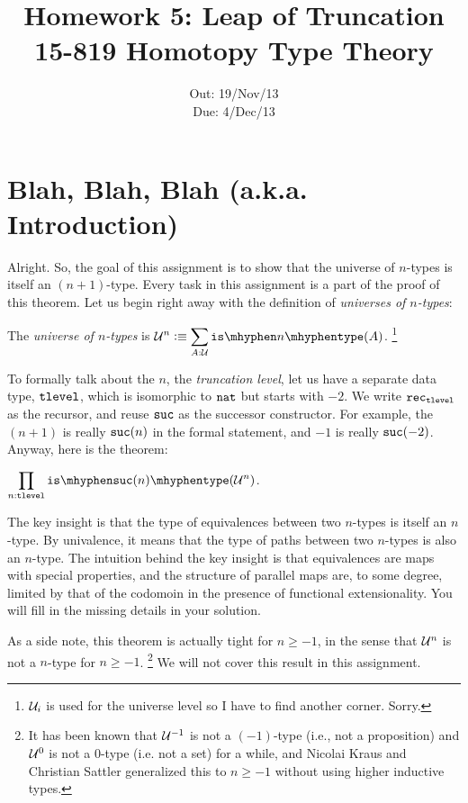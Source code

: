 \documentclass[12pt]{article}
\title{\Large\textbf{
  Homework 5: Leap of Truncation}
\normalsize\\
15-819 Homotopy Type Theory}
\author{}
\date{%
Out: 19/Nov/13\\
Due: 4/Dec/13
}
\theoremstyle{plain}
\begin{document}
\maketitle

\section{Blah, Blah, Blah (a.k.a. Introduction)}

Alright. So, the goal of this assignment is to show that
the universe of $n$-types is itself an $(n{+}1)$-type.
Every task in this assignment is a part of the proof of this theorem.
Let us begin right away with the definition of \emph{universes of $n$-types}:
\begin{definition}
  The
  \emph{universe of $n$-types}
  is
  $\displaystyle \U^n \defeq \sum_{A:\U} \istype{n}(A)$.%
  \footnote{$\mathcal{U}_i$ is used for the universe level so I have to find another corner. Sorry.}
\end{definition}

To formally talk about the $n$, the \emph{truncation level},
let us have a separate data type, $\mathtt{tlevel}$,
which is isomorphic to $\mathtt{nat}$ but starts with $-2$.
We write $\mathtt{rec}_{\mathtt{tlevel}}$ as the recursor,
and reuse $\mathtt{suc}$ as the successor constructor.
For example, the $(n{+}1)$ is really $\mathtt{suc}(n)$ in the formal statement,
and $-1$ is really $\mathtt{suc}(-2)$.
Anyway, here is the theorem:
\begin{theorem}
  $\displaystyle \prod_{n:\tlevel} \istype{\suc(n)}(\U^n)$.
\end{theorem}

The key insight is that
the type of equivalences between two $n$-types
is itself an $n$-type.
By univalence,
it means that the type of paths between two $n$-types
is also an $n$-type.
The intuition behind the key insight is that
equivalences are maps with special properties,
and the structure of parallel maps are, to some degree,
limited by that of the codomoin in the presence of functional extensionality.
You will fill in the missing details in your solution.

As a side note,
this theorem is actually tight for $n \geq -1$, in the sense that
$\mathcal{U}^n$ is not a $n$-type for $n \geq -1$.%
\footnote{It has been known that $\mathcal{U}^{-1}$ is not a $(-1)$-type (i.e., not a proposition)
  and $\mathcal{U}^0$ is not a $0$-type (i.e. not a set) for a while,
  and Nicolai Kraus and Christian Sattler generalized this to $n\geq -1$
  without using higher inductive types.}
We will not cover this result in this assignment.
\end{document}
